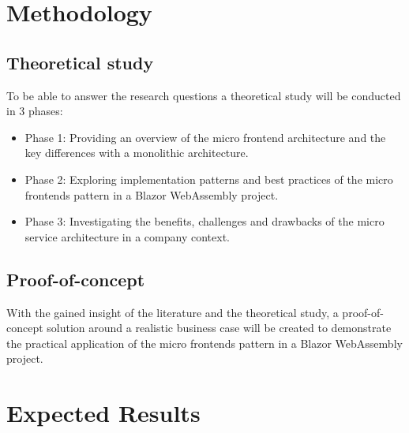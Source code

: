 
\section{Methodology}
\label{sec:methodology}


\subsection{Theoretical study}
To be able to answer the research questions a theoretical study will be
conducted in 3 phases:
\begin{itemize}
    \item Phase 1: Providing an overview of the micro frontend architecture and
    the key differences with a monolithic architecture.
    \item Phase 2: Exploring implementation patterns and best practices of the
    micro frontends pattern  in a Blazor WebAssembly project.
    \item Phase 3: Investigating the benefits, challenges and drawbacks of the
    micro service architecture in a company context.
\end{itemize}

\subsection{Proof-of-concept}
With the gained insight of the literature and the theoretical study, a
proof-of-concept solution around a realistic business case will be created to
demonstrate the practical application of the micro frontends pattern in a Blazor
WebAssembly project.


\section{Expected Results}
\label{sec:expected-results}


